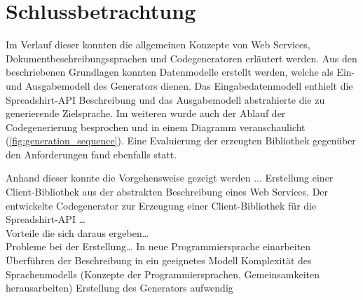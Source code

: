 \chapter{Schlussbetrachtung}
\label{chap:summary}


Im Verlauf dieser \thesisDesignator{} konnten die allgemeinen Konzepte von Web Services, Dokumentbeschreibungssprachen und Codegeneratoren erläutert werden. Aus den beschriebenen Grundlagen konnten Datenmodelle erstellt werden, welche als Ein- und Ausgabemodell des Generators dienen. Das Eingabedatenmodell enthielt die Spreadshirt-\gls{API} Beschreibung und das Ausgabemodell abstrahierte die zu generierende Zielsprache. Im weiteren wurde auch der Ablauf der Codegenerierung besprochen und in einem Diagramm veranschaulicht (\cref{fig:generation_sequence}). Eine Evaluierung der erzeugten Bibliothek gegenüber den Anforderungen fand ebenfalls statt.

Anhand dieser \thesisDesignator{} konnte die Vorgehensweise gezeigt werden ...
Erstellung einer Client-Bibliothek aus der abstrakten Beschreibung eines Web Services.
Der entwickelte Codegenerator zur Erzeugung einer Client-Bibliothek für die Spreadshirt-\gls{API} \ldots\\
Vorteile die sich daraus ergeben\ldots\\

Probleme bei der Erstellung\ldots
    In neue Programmiersprache einarbeiten
    Überführen der Beschreibung in ein geeignetes Modell
    Komplexität des Sprachenmodells (Konzepte der Programmiersprachen, Gemeinsamkeiten herausarbeiten)
    Erstellung des Generators aufwendig 


\label{sec:prospect}

%
